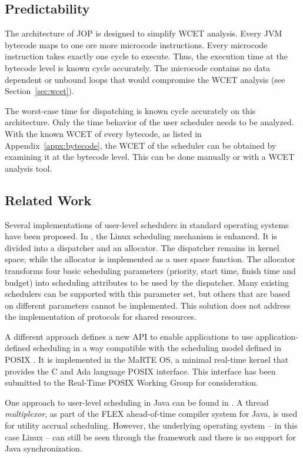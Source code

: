 \subsection{Predictability}

The architecture of JOP is designed to simplify WCET analysis. Every
JVM bytecode maps to one ore more microcode instructions. Every
microcode instruction takes exactly one cycle to execute. Thus, the
execution time at the bytecode level is known cycle accurately. The
microcode contains no data dependent or unbound loops that would
compromise the WCET analysis (see Section~\ref{sec:wcet}).

The worst-case time for dispatching is known cycle accurately on
this architecture. Only the time behavior of the user scheduler
needs to be analyzed. With the known WCET of every bytecode, as
listed in Appendix~\ref{appx:bytecode}, the WCET of the scheduler
can be obtained by examining it at the bytecode level. This can be
done manually or with a WCET analysis tool.

\subsection{Related Work}

Several implementations of user-level schedulers in standard
operating systems have been proposed. In \cite{REDLinux2003}, the
Linux scheduling mechanism is enhanced. It is divided into a
dispatcher and an allocator. The dispatcher remains in kernel space;
while the allocator is implemented as a user space function. The
allocator transforms four basic scheduling parameters (priority,
start time, finish time and budget) into scheduling attributes to be
used by the dispatcher. Many existing schedulers can be supported
with this parameter set, but others that are based on different
parameters cannot be implemented. This solution does not address the
implementation of protocols for shared resources.

A different approach defines a new API to enable applications to use
application-defined scheduling in a way compatible with the
scheduling model defined in POSIX \cite{787339}. It is implemented
in the MaRTE OS, a minimal real-time kernel that provides the C and
Ada language POSIX interface. This interface has been submitted to
the Real-Time POSIX Working Group for consideration.

One approach to user-level scheduling in Java can be found in
\cite{Feizabadi:2003:UAS}. A thread \emph{multiplexor}, as part of
the FLEX ahead-of-time compiler system for Java, is used for utility
accrual scheduling. However, the underlying operating system -- in
this case Linux -- can still be seen through the framework and there
is no support for Java synchronization.

